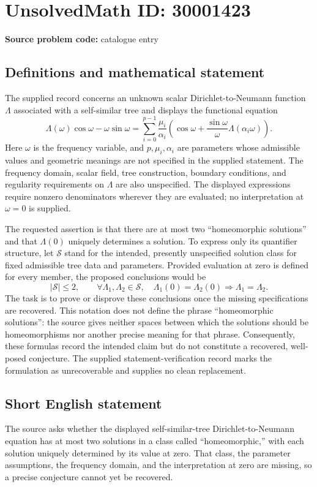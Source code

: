 \documentclass[11pt]{article}
\begin{document}
\section*{UnsolvedMath ID: 30001423}
\textbf{Source problem code:} catalogue entry
\subsection{Definitions and mathematical statement}
The supplied record concerns an unknown scalar Dirichlet-to-Neumann function \(\Lambda\) associated with a self-similar tree and displays the functional equation
\[
\Lambda(\omega)\cos\omega-\omega\sin\omega
=
\sum_{i=0}^{p-1}\frac{\mu_i}{\alpha_i}
\left(\cos\omega+\frac{\sin\omega}{\omega}\Lambda(\alpha_i\omega)\right).
\]
Here \(\omega\) is the frequency variable, and \(p,\mu_i,\alpha_i\) are parameters whose admissible values and geometric meanings are not specified in the supplied statement. The frequency domain, scalar field, tree construction, boundary conditions, and regularity requirements on \(\Lambda\) are also unspecified. The displayed expressions require nonzero denominators wherever they are evaluated; no interpretation at \(\omega=0\) is supplied.

The requested assertion is that there are at most two ``homeomorphic solutions'' and that \(\Lambda(0)\) uniquely determines a solution. To express only its quantifier structure, let \(\mathcal S\) stand for the intended, presently unspecified solution class for fixed admissible tree data and parameters. Provided evaluation at zero is defined for every member, the proposed conclusions would be
\[
|\mathcal S|\leq 2,
\qquad
\forall\Lambda_1,\Lambda_2\in\mathcal S,\quad
\Lambda_1(0)=\Lambda_2(0)\Longrightarrow\Lambda_1=\Lambda_2.
\]
The task is to prove or disprove these conclusions once the missing specifications are recovered. This notation does not define the phrase ``homeomorphic solutions'': the source gives neither spaces between which the solutions should be homeomorphisms nor another precise meaning for that phrase. Consequently, these formulas record the intended claim but do not constitute a recovered, well-posed conjecture. The supplied statement-verification record marks the formulation as unrecoverable and supplies no clean replacement.
\subsection{Short English statement}
The source asks whether the displayed self-similar-tree Dirichlet-to-Neumann equation has at most two solutions in a class called ``homeomorphic,'' with each solution uniquely determined by its value at zero. That class, the parameter assumptions, the frequency domain, and the interpretation at zero are missing, so a precise conjecture cannot yet be recovered.
\end{document}
